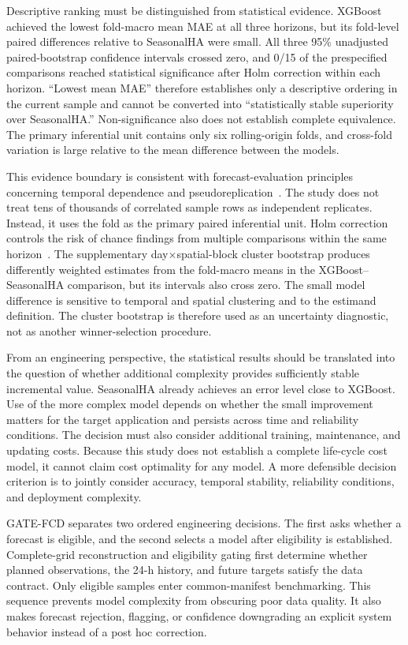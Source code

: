 \documentclass[pdflatex,sn-mathphys-num,iicol]{sn-jnl}
\begin{document}
Descriptive ranking must be distinguished from statistical evidence. XGBoost achieved the lowest fold-macro mean MAE at all three horizons, but its fold-level paired differences relative to SeasonalHA were small. All three 95\% unadjusted paired-bootstrap confidence intervals crossed zero, and 0/15 of the prespecified comparisons reached statistical significance after Holm correction within each horizon. ``Lowest mean MAE'' therefore establishes only a descriptive ordering in the current sample and cannot be converted into ``statistically stable superiority over SeasonalHA.'' Non-significance also does not establish complete equivalence. The primary inferential unit contains only six rolling-origin folds, and cross-fold variation is large relative to the mean difference between the models.

This evidence boundary is consistent with forecast-evaluation principles concerning temporal dependence and pseudoreplication~\cite{Hewamalage2023ForecastEvaluation}. The study does not treat tens of thousands of correlated sample rows as independent replicates. Instead, it uses the fold as the primary paired inferential unit. Holm correction controls the risk of chance findings from multiple comparisons within the same horizon~\cite{GarciaPerez2023MultipleTesting}. The supplementary day$\times$spatial-block cluster bootstrap produces differently weighted estimates from the fold-macro means in the XGBoost--SeasonalHA comparison, but its intervals also cross zero. The small model difference is sensitive to temporal and spatial clustering and to the estimand definition. The cluster bootstrap is therefore used as an uncertainty diagnostic, not as another winner-selection procedure.

From an engineering perspective, the statistical results should be translated into the question of whether additional complexity provides sufficiently stable incremental value. SeasonalHA already achieves an error level close to XGBoost. Use of the more complex model depends on whether the small improvement matters for the target application and persists across time and reliability conditions. The decision must also consider additional training, maintenance, and updating costs. Because this study does not establish a complete life-cycle cost model, it cannot claim cost optimality for any model. A more defensible decision criterion is to jointly consider accuracy, temporal stability, reliability conditions, and deployment complexity.

GATE-FCD separates two ordered engineering decisions. The first asks whether a forecast is eligible, and the second selects a model after eligibility is established. Complete-grid reconstruction and eligibility gating first determine whether planned observations, the 24-h history, and future targets satisfy the data contract. Only eligible samples enter common-manifest benchmarking. This sequence prevents model complexity from obscuring poor data quality. It also makes forecast rejection, flagging, or confidence downgrading an explicit system behavior instead of a post hoc correction.
\end{document}
